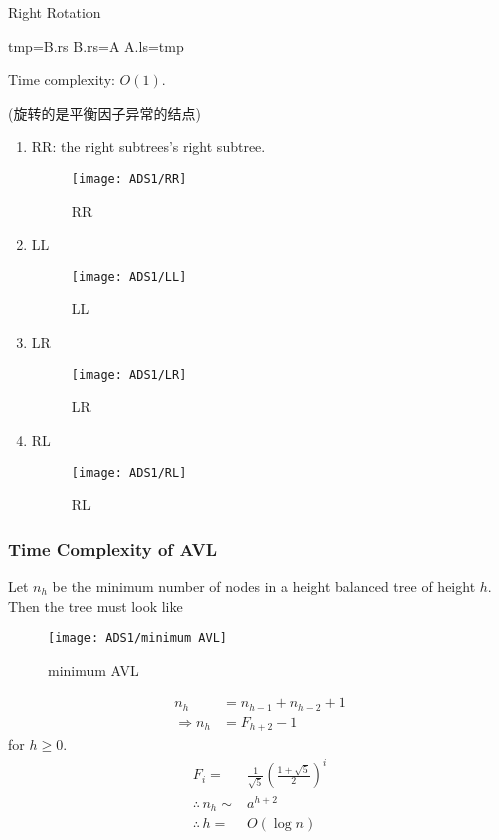 \begin{algorithm}[H]
    \caption{Right Rotation}
    \begin{algorithmic}
        \State tmp=B.rs
        \State B.rs=A
        \State A.ls=tmp
    \end{algorithmic}
\end{algorithm}

Time complexity: $O(1)$. 

(旋转的是平衡因子异常的结点)
\begin{enumerate}
    \item RR: the right subtrees's right subtree. 
    \begin{figure}[H]
        \centering
        \texttt{[image: ADS1/RR]}
        \caption{RR}
    \end{figure}
    \item LL
    \begin{figure}[H]
        \centering
        \texttt{[image: ADS1/LL]}
        \caption{LL}
    \end{figure}
    \item LR
    \begin{figure}[H]
        \centering
        \texttt{[image: ADS1/LR]}
        \caption{LR}
    \end{figure}
    \item RL
    \begin{figure}[H]
        \centering
        \texttt{[image: ADS1/RL]}
        \caption{RL}
    \end{figure}
\end{enumerate}

\subsubsection{Time Complexity of AVL}
Let $n_h$ be the minimum number of nodes in a height balanced tree of height $h$. Then the tree must look like 
\begin{figure}[H]
    \centering
    \texttt{[image: ADS1/minimum AVL]}
    \caption{minimum AVL}
\end{figure}
\begin{align*}
    n_h&=n_{h-1}+n_{h-2}+1\\
    \Rightarrow n_h&=F_{h+2}-1
\end{align*}
for $h\ge 0$. 
\begin{align*}
    F_i=&\frac{1}{\sqrt{5}}\left(\frac{1+\sqrt{5}}{2}\right)^i\\
    \therefore \, n_h\sim &a^{h+2}\\
    \therefore \, h=&O(\log n)
\end{align*}

